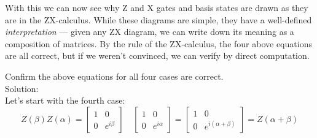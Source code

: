 \documentclass{article}
\newcommand{\soln}{{\\[1em] \hspace{-1em}\color{greentitle}\sffamily\large Solution: \\[0.5em]}}
\theoremstyle{definition}
\begin{document}
With this we can now see why Z and X gates and basis states are drawn as they are in the ZX-calculus.
While these diagrams are simple, they have a well-defined \textit{interpretation} --- given any ZX diagram, we can write down its meaning as a composition of matrices.
By the rule of the ZX-calculus, the four above equations are all correct, but if we weren't convinced, we can verify by direct computation.
\begin{example}
	Confirm the above equations for all four cases are correct.
	\soln \textnormal{Let's start with the fourth case:}
	\begin{equation}
		Z(\beta) Z(\alpha) = \begin{bmatrix}
			1 & 0\\
			0 & e^{i \beta}
		\end{bmatrix} \quad \begin{bmatrix}
			1 & 0\\
			0 & e^{i \alpha}
		\end{bmatrix} = \begin{bmatrix}
			1 & 0\\
			0 & e^{i (\alpha + \beta)}
		\end{bmatrix} = Z(\alpha + \beta)
	\end{equation}


\end{example}
\end{document}
